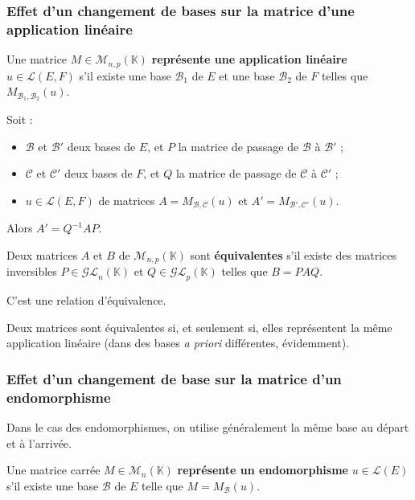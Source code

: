 \documentclass[french]{article}
\newcommand{\K}{\mathbb{K}}
\newcommand{\inv}{^{-1}}
\theoremstyle{plain}
\theoremstyle{definition}
\theoremstyle{remark}
\begin{document}
\subsubsection*{Effet d'un changement de bases sur la matrice d'une application linéaire}

\begin{dfn}
	Une matrice $M\in\mathcal{M}_{n,p}(\K)$ \textbf{représente une application linéaire} $u\in\mathcal{L}(E,F)$ s'il existe une base $\mathcal{B}_1$ de $E$ et une base $\mathcal{B}_2$ de $F$ telles que $M_{\mathcal{B}_1,\mathcal{B}_2}(u)$.
\end{dfn}

Soit :
\begin{itemize}
	\item $\mathcal{B}$ et $\mathcal{B}'$ deux bases de $E$, et $P$ la matrice de passage de $\mathcal{B}$ à $\mathcal{B}'$ ;
	\item $\mathcal{C}$ et $\mathcal{C}'$ deux bases de $F$, et $Q$ la matrice de passage de $\mathcal{C}$ à $\mathcal{C}'$ ;
	\item $u\in\mathcal{L}(E,F)$ de matrices $A=M_{\mathcal{B},\mathcal{C}}(u)$ et $A'=M_{\mathcal{B'},\mathcal{C'}}(u)$.
\end{itemize}
Alors $A'=Q\inv AP$.

\begin{dfn}
	Deux matrices $A$ et $B$ de $\mathcal{M}_{n,p}(\K)$ sont \textbf{équivalentes} s'il existe des matrices inversibles $P\in\mathcal{GL}_n(\K)$ et $Q\in\mathcal{GL}_p(\K)$ telles que $B=PAQ$.
\end{dfn}

C'est une relation d'équivalence.

\begin{prop}%
	Deux matrices sont équivalentes si, et seulement si, elles représentent la même application linéaire (dans des bases \textit{a priori} différentes, évidemment).
\end{prop}

\subsubsection*{Effet d'un changement de base sur la matrice d'un endomorphisme}

Dans le cas des endomorphismes, on utilise généralement la même base au départ et à l'arrivée.

\begin{dfn}
	Une matrice carrée $M\in\mathcal{M}_n(\K)$ \textbf{représente un endomorphisme} $u\in\mathcal{L}(E)$ s'il existe une base $\mathcal{B}$ de $E$ telle que $M=M_\mathcal{B}(u)$.
\end{dfn}
\end{document}
